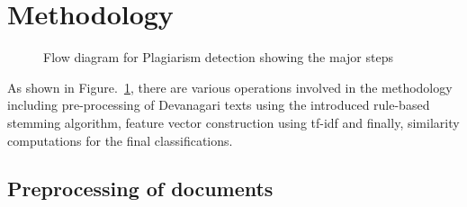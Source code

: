 \documentclass[conference]{IEEEtran}
\begin{document}
\section{Methodology}
\begin{figure}[htbp]
\caption{Flow diagram for Plagiarism detection showing the major steps} 
\label{flow} 
\end{figure}

As shown in Figure.~\ref{flow}, there are various operations involved in the
methodology including pre-processing of Devanagari texts using the introduced 
rule-based stemming algorithm, feature vector construction using tf-idf and
finally, similarity computations for the final classifications.

\subsection{Preprocessing of documents}
\end{document}
